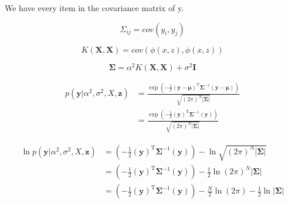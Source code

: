 \documentclass[11pt]{article}
\newcommand{\mbf}[1]{{\boldsymbol{\mathbf{#1}}}}
\renewcommand{\bm}{\mbf}
\begin{document}
\begin{enumerate}
We have every item in the covariance matrix of y.


$$
\Sigma_{ij} = cov(y_i, y_j)
$$


\begin{equation}
    K(\mathbf{X}, \mathbf{X}) = cov(\phi{(x,z)}, \phi{(x,z)})
\end{equation}

\begin{equation}
    \boldsymbol{\Sigma}=\alpha^{2} K(\mathbf{X}, \mathbf{X})+\sigma^{2} \boldsymbol{I}
\end{equation}


\begin{align}
    p(\bm{y} | \alpha^2, \sigma^2, X,\bm{z}) &=\frac{\exp \left(-\frac{1}{2}(\mathbf{y}-\boldsymbol{\mu})^{\mathrm{T}} \boldsymbol{\Sigma}^{-1}(\mathbf{y}-\boldsymbol{\mu})\right)}{\sqrt{(2 \pi)^{N}|\boldsymbol{\Sigma}|}} \\
    &=\frac{\exp \left(-\frac{1}{2}(\mathbf{y})^{\mathrm{T}} \boldsymbol{\Sigma}^{-1}(\mathbf{y})\right)}{\sqrt{(2 \pi)^{N}|\boldsymbol{\Sigma}|}} 
\end{align}

\begin{align}
    \ln p(\bm{y} | \alpha^2, \sigma^2, X,\bm{z}) 
    &= \left(-\frac{1}{2}(\mathbf{y})^{\mathrm{T}} \boldsymbol{\Sigma}^{-1}(\mathbf{y})\right) -  \ln {\sqrt{(2 \pi)^{N}|\boldsymbol{\Sigma}|}} \\
    &= \left(-\frac{1}{2}(\mathbf{y})^{\mathrm{T}} \boldsymbol{\Sigma}^{-1}(\mathbf{y})\right) -  \frac{1}{2} \ln {(2 \pi)^{N}|\boldsymbol{\Sigma}|} \\
    &= \left(-\frac{1}{2}(\mathbf{y})^{\mathrm{T}} \boldsymbol{\Sigma}^{-1}(\mathbf{y})\right) -  \frac{N}{2} \ln {(2 \pi)}  - \frac{1}{2} \ln {|\boldsymbol{\Sigma}|} 
\end{align}



\end{enumerate}
\end{document}
